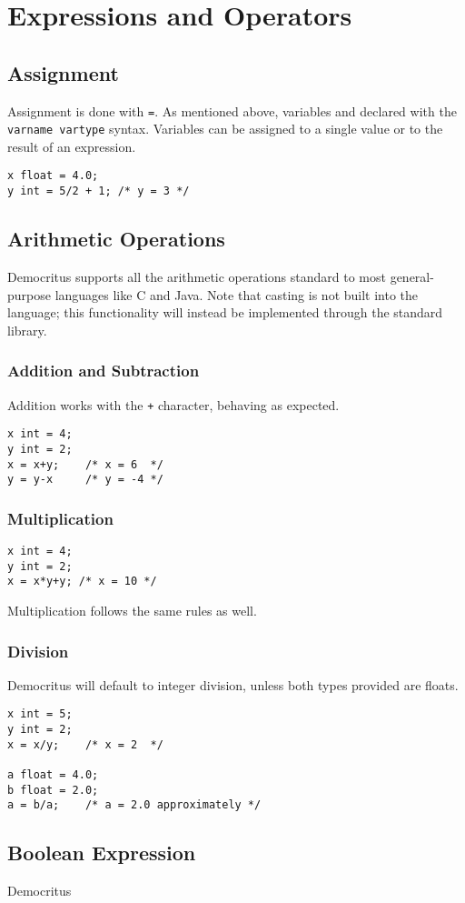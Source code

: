 \chapter{Expressions and Operators}
	\section{Assignment}
		Assignment is done with \texttt{=}. As mentioned above, variables and declared with the \texttt{varname vartype} syntax. Variables can be assigned to a single value or to the result of an expression. 
		
		\begin{lstlisting}
x float = 4.0;
y int = 5/2 + 1; /* y = 3 */
		\end{lstlisting}
		
	\section{Arithmetic Operations}
		Democritus supports all the arithmetic operations standard to most general-purpose languages like C and Java. Note that casting is not built into the language; this functionality will instead be implemented through the standard library.
		
		\subsection{Addition and Subtraction}
			Addition works with the \texttt{+} character, behaving as expected.
			\begin{lstlisting}
x int = 4;
y int = 2;
x = x+y; 	/* x = 6  */
y = y-x 	/* y = -4 */
			\end{lstlisting}
						
		\subsection{Multiplication}
			\begin{lstlisting}
x int = 4;
y int = 2;
x = x*y+y; /* x = 10 */
			\end{lstlisting}
			
			\noindent Multiplication follows the same rules as well. 
		\subsection{Division}
			Democritus will default to integer division, unless both types provided are floats. 
			\begin{lstlisting}
x int = 5;
y int = 2;
x = x/y; 	/* x = 2  */

a float = 4.0;
b float = 2.0;
a = b/a; 	/* a = 2.0 approximately */
			\end{lstlisting}
			
	\section{Boolean Expression}
		Democritus 